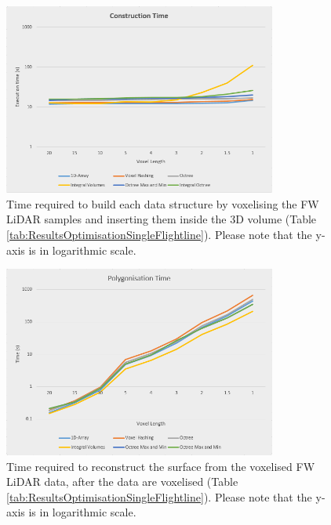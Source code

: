 \documentclass{subfiles}
\begin{document}
\begin{figure}[!htbp]
	\centering
	\includegraphics[width=0.8\textwidth]{img/opt/ConstructionTime}
	\caption{Time required to build each data structure by voxelising the FW LiDAR samples and inserting them inside the 3D volume (Table \ref{tab:ResultsOptimisationSingleFlightline}). Please note that the y-axis is in logarithmic scale.}
	\label{fig:ConTime}
\end{figure}

\begin{figure}[!htbp]
	\centering
	\includegraphics[width=0.8\textwidth]{img/opt/PolygonisationTime}
	\caption{Time required to reconstruct the surface from the voxelised FW LiDAR data, after the data are voxelised (Table \ref{tab:ResultsOptimisationSingleFlightline}). Please note that the y-axis is in logarithmic scale.}
	\label{fig:PolTime}
\end{figure}
\end{document}
